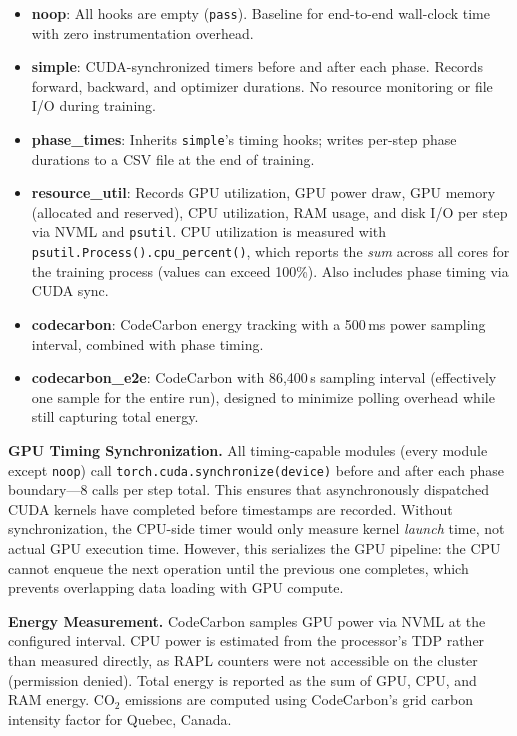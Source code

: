\documentclass[10pt,twocolumn]{article}
\begin{document}
\begin{itemize}
    \item \textbf{noop}: All hooks are empty (\texttt{pass}). Baseline for end-to-end wall-clock time with zero instrumentation overhead.
    \item \textbf{simple}: CUDA-synchronized timers before and after each phase. Records forward, backward, and optimizer durations. No resource monitoring or file I/O during training.
    \item \textbf{phase\_times}: Inherits \texttt{simple}'s timing hooks; writes per-step phase durations to a CSV file at the end of training.
    \item \textbf{resource\_util}: Records GPU utilization, GPU power draw, GPU memory (allocated and reserved), CPU utilization, RAM usage, and disk I/O per step via NVML and \texttt{psutil}. CPU utilization is measured with \texttt{psutil.Process().cpu\_percent()}, which reports the \emph{sum} across all cores for the training process (values can exceed 100\%). Also includes phase timing via CUDA sync.
    \item \textbf{codecarbon}: CodeCarbon energy tracking with a 500\,ms power sampling interval, combined with phase timing.
    \item \textbf{codecarbon\_e2e}: CodeCarbon with 86{,}400\,s sampling interval (effectively one sample for the entire run), designed to minimize polling overhead while still capturing total energy.
\end{itemize}

\textbf{GPU Timing Synchronization.}
All timing-capable modules (every module except \texttt{noop}) call \texttt{torch.cuda.synchronize(device)} before and after each phase boundary---8 calls per step total. This ensures that asynchronously dispatched CUDA kernels have completed before timestamps are recorded. Without synchronization, the CPU-side timer would only measure kernel \emph{launch} time, not actual GPU execution time. However, this serializes the GPU pipeline: the CPU cannot enqueue the next operation until the previous one completes, which prevents overlapping data loading with GPU compute.

\textbf{Energy Measurement.}
CodeCarbon samples GPU power via NVML at the configured interval. CPU power is estimated from the processor's TDP rather than measured directly, as RAPL counters were not accessible on the cluster (permission denied). Total energy is reported as the sum of GPU, CPU, and RAM energy. CO$_2$ emissions are computed using CodeCarbon's grid carbon intensity factor for Quebec, Canada.
\end{document}
